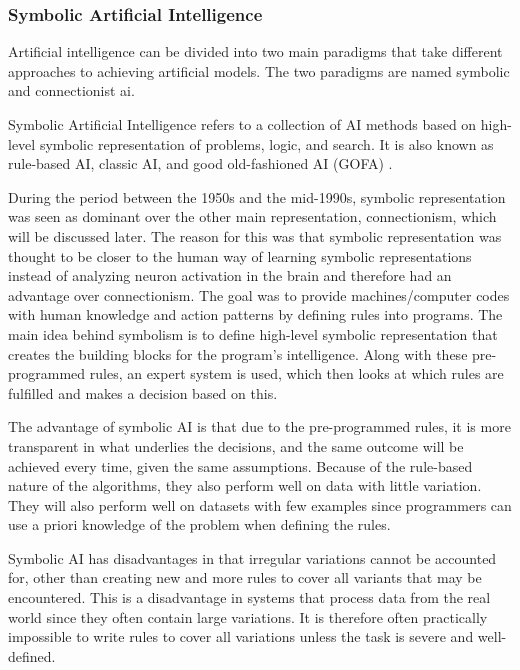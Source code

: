 \subsubsection{Symbolic Artificial Intelligence}
Artificial intelligence can be divided into two main paradigms that take different approaches to achieving artificial models. The two paradigms are named symbolic and connectionist \gls{ai}.

Symbolic Artificial Intelligence refers to a collection of AI methods based on high-level symbolic representation of problems, logic, and search. It is also known as rule-based AI, classic AI, and good old-fashioned AI (GOFA) \cite{haugelandArtificialIntelligenceVery1989}. 

During the period between the 1950s and the mid-1990s, symbolic representation was seen as dominant over the other main representation, connectionism, which will be discussed later. The reason for this was that symbolic representation was thought to be closer to the human way of learning symbolic representations instead of analyzing neuron activation in the brain and therefore had an advantage over connectionism.
The goal was to provide machines/computer codes with human knowledge and action patterns by defining rules into programs. The main idea behind symbolism is to define high-level symbolic representation that creates the building blocks for the program's intelligence. Along with these pre-programmed rules, an expert system is used, which then looks at which rules are fulfilled and makes a decision based on this.

The advantage of symbolic AI is that due to the pre-programmed rules, it is more transparent in what underlies the decisions, and the same outcome will be achieved every time, given the same assumptions. Because of the rule-based nature of the algorithms, they also perform well on data with little variation. They will also perform well on datasets with few examples since programmers can use a priori knowledge of the problem when defining the rules.

Symbolic AI has disadvantages in that irregular variations cannot be accounted for, other than creating new and more rules to cover all variants that may be encountered. This is a disadvantage in systems that process data from the real world since they often contain large variations. It is therefore often practically impossible to write rules to cover all variations unless the task is severe and well-defined.



